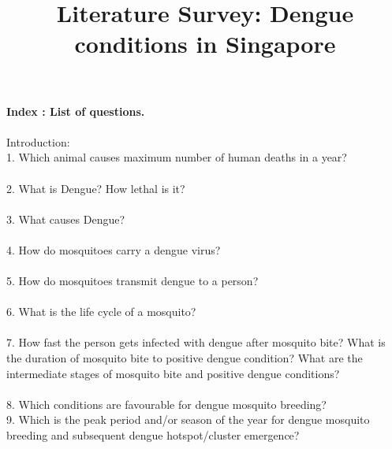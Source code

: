 \documentclass[11pt]{exam}
\begin{document}
\title{\textbf{Literature Survey: Dengue conditions in Singapore}}
\maketitle

\textbf{Index : List of questions.} \\ \\
Introduction: \\

1. Which animal causes maximum number of human deaths in a year? \\ \\
2. What is Dengue? How lethal is it? \\ \\
3. What causes Dengue?  \\ \\
4. How do mosquitoes carry a dengue virus? \\ \\
5. How do mosquitoes transmit dengue to a person? \\ \\%
6. What is the life cycle of a mosquito?  \\ \\
7. How fast the person gets infected with dengue after mosquito bite? What is the duration of mosquito bite to positive dengue condition? What are the intermediate stages of mosquito bite and positive dengue conditions?\\ \\
8. Which conditions are favourable for dengue mosquito breeding?\\ %
9. Which is the peak period and/or season of the year for dengue mosquito breeding and subsequent dengue hotspot/cluster emergence? \\ \\%
\end{document}
